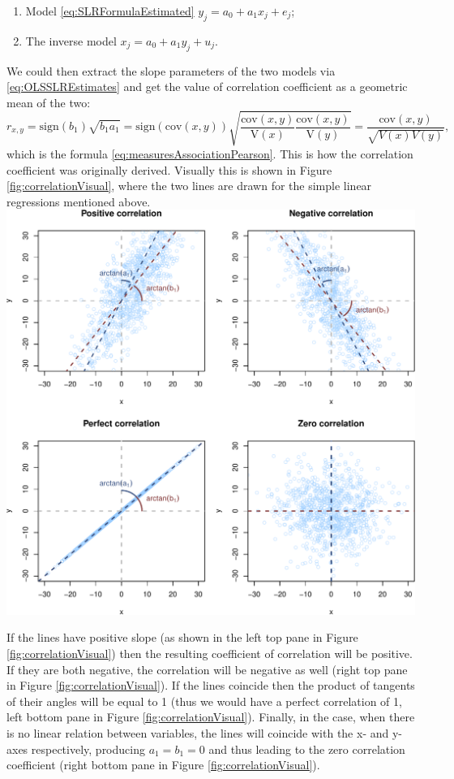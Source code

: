 \documentclass[
]{book}
\providecommand{\tightlist}{%
  \setlength{\itemsep}{0pt}\setlength{\parskip}{0pt}}
\theoremstyle{definition}
\theoremstyle{definition}
\theoremstyle{definition}
\theoremstyle{definition}
\theoremstyle{remark}
\begin{document}
\begin{enumerate}
\def\labelenumi{\arabic{enumi}.}
\tightlist
\item
  Model \eqref{eq:SLRFormulaEstimated} \(y_j = a_0 + a_1 x_j + e_j\);
\item
  The inverse model \(x_j = a_0 + a_1 y_j + u_j\).
\end{enumerate}

We could then extract the slope parameters of the two models via \eqref{eq:OLSSLREstimates} and get the value of correlation coefficient as a geometric mean of the two:
\begin{equation}
    r_{x,y} = \mathrm{sign}(b_1) \sqrt{{b}_1 a_1} = \mathrm{sign}(\mathrm{cov}(x,y)) \sqrt{\frac{\mathrm{cov}(x,y)}{\mathrm{V}(x)} \frac{\mathrm{cov}(x,y)}{\mathrm{V}(y)}} = \frac{\mathrm{cov}(x,y)}{\sqrt{V(x)V(y)}} ,
    \label{eq:correlationDerivationPearson}
\end{equation}
which is the formula \eqref{eq:measuresAssociationPearson}. This is how the correlation coefficient was originally derived. Visually this is shown in Figure \ref{fig:correlationVisual}, where the two lines are drawn for the simple linear regressions mentioned above.
\includegraphics{Svetunkov---Statistics-for-Business-Analytics_files/figure-latex/correlationVisual-1.pdf}

If the lines have positive slope (as shown in the left top pane in Figure \ref{fig:correlationVisual}) then the resulting coefficient of correlation will be positive. If they are both negative, the correlation will be negative as well (right top pane in Figure \ref{fig:correlationVisual}). If the lines coincide then the product of tangents of their angles will be equal to 1 (thus we would have a perfect correlation of 1, left bottom pane in Figure \ref{fig:correlationVisual}). Finally, in the case, when there is no linear relation between variables, the lines will coincide with the x- and y- axes respectively, producing \(a_1=b_1=0\) and thus leading to the zero correlation coefficient (right bottom pane in Figure \ref{fig:correlationVisual}).
\end{document}
